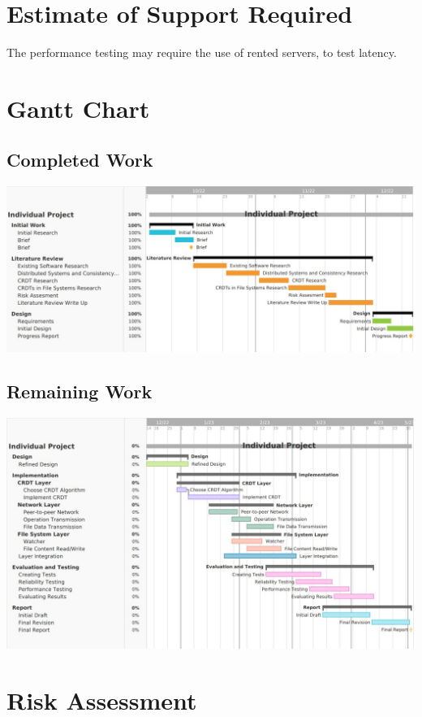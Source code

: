 \documentclass[12pt]{report}
\begin{document}
\section{Estimate of Support Required}
The performance testing may require the use of rented servers, to test latency.

\section{Gantt Chart}

\subsection{Completed Work}
\includegraphics[width=16cm]{images/completed.jpg}


\subsection{Remaining Work}
\begin{center}
    \includegraphics[width=16cm]{images/remaining.jpg}
\end{center} 


\section{Risk Assessment}
\end{document}

